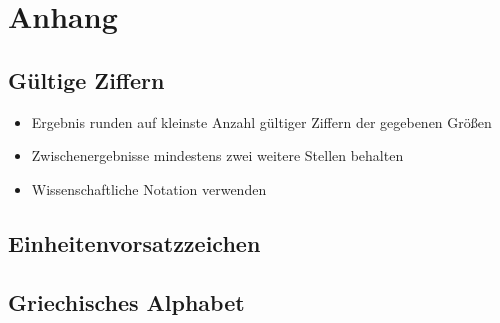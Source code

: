 \chapter{Anhang}

\section{Gültige Ziffern}

\begin{itemize}
  \item Ergebnis runden auf kleinste Anzahl gültiger Ziffern der gegebenen Grö\ss en
  \item Zwischenergebnisse mindestens zwei weitere Stellen behalten
  \item Wissenschaftliche Notation verwenden
\end{itemize}

\newpage

\section{Einheitenvorsatzzeichen}


\section{Griechisches Alphabet}

